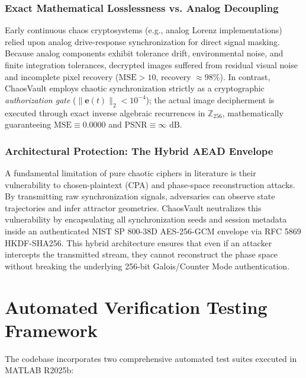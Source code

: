 \documentclass[12pt,a4paper,oneside]{report}
\begin{document}
\subsection{Exact Mathematical Losslessness vs. Analog Decoupling}
Early continuous chaos cryptosystems (e.g., analog Lorenz implementations) relied upon analog drive-response synchronization for direct signal masking. Because analog components exhibit tolerance drift, environmental noise, and finite integration tolerances, decrypted images suffered from residual visual noise and incomplete pixel recovery ($\text{MSE} > 10$, recovery $\approx 98\%$). In contrast, ChaosVault employs chaotic synchronization strictly as a cryptographic \textit{authorization gate} ($\|\mathbf{e}(t)\|_2 < 10^{-4}$); the actual image decipherment is executed through exact inverse algebraic recurrences in $\mathbb{Z}_{256}$, mathematically guaranteeing $\text{MSE} \equiv 0.0000$ and $\text{PSNR} \equiv \infty\text{ dB}$.

\subsection{Architectural Protection: The Hybrid AEAD Envelope}
A fundamental limitation of pure chaotic ciphers in literature is their vulnerability to chosen-plaintext (CPA) and phase-space reconstruction attacks. By transmitting raw synchronization signals, adversaries can observe state trajectories and infer attractor geometries. ChaosVault neutralizes this vulnerability by encapsulating all synchronization seeds and session metadata inside an authenticated NIST SP 800-38D AES-256-GCM envelope via RFC 5869 HKDF-SHA256. This hybrid architecture ensures that even if an attacker intercepts the transmitted stream, they cannot reconstruct the phase space without breaking the underlying 256-bit Galois/Counter Mode authentication.

\chapter{Automated Verification Testing Framework}

The codebase incorporates two comprehensive automated test suites executed in MATLAB R2025b:
\end{document}
